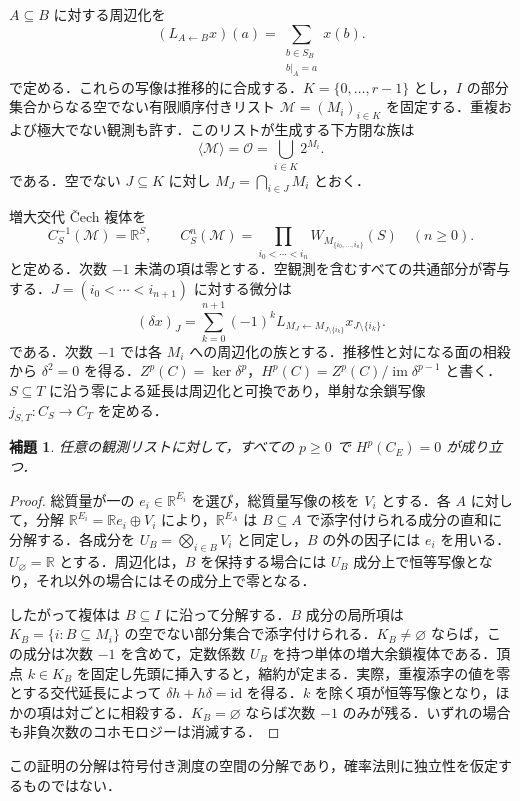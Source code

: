 \documentclass[11pt,a4paper]{article}
\numberwithin{equation}{section}
\theoremstyle{japanese}
\newtheorem{lemma}[theorem]{補題}
\theoremstyle{remark}
\newcommand{\R}{\mathbb R}
\newcommand{\M}{\mathcal M}
\newcommand{\OO}{\mathcal O}
\newcommand{\im}{\operatorname{im}}
\newcommand{\id}{\mathrm{id}}
\begin{document}
$A\subseteq B$ に対する周辺化を
\begin{equation}\label{eq:marginal}
 (L_{A\leftarrow B}x)(a)=\sum_{\substack{b\in S_B\\b|_A=a}}x(b).
\end{equation}
で定める．これらの写像は推移的に合成する．$K=\{0,\ldots,r-1\}$ とし，$I$ の部分集合からなる空でない有限順序付きリスト $\M=(M_i)_{i\in K}$ を固定する．重複および極大でない観測も許す．このリストが生成する下方閉な族は
\[
 \langle\M\rangle=\OO=\bigcup_{i\in K}2^{M_i}.
\]
である．空でない $J\subseteq K$ に対し $M_J=\bigcap_{i\in J}M_i$ とおく．

増大交代 {\latinfont\v{C}ech} 複体を
\begin{equation}\label{eq:complex}
 C_S^{-1}(\M)=\R^S,\qquad
 C_S^n(\M)=\prod_{i_0<\cdots<i_n}W_{M_{\{i_0,\ldots,i_n\}}}(S)\quad(n\ge0).
\end{equation}
と定める．次数 $-1$ 未満の項は零とする．空観測を含むすべての共通部分が寄与する．$J=(i_0<\cdots<i_{n+1})$ に対する微分は
\begin{equation}\label{eq:delta}
 (\delta x)_J=\sum_{k=0}^{n+1}(-1)^k
 L_{M_J\leftarrow M_{J\setminus\{i_k\}}}x_{J\setminus\{i_k\}}.
\end{equation}
である．次数 $-1$ では各 $M_i$ への周辺化の族とする．推移性と対になる面の相殺から $\delta^2=0$ を得る．$Z^p(C)=\ker\delta^p$，$H^p(C)=Z^p(C)/\im\delta^{p-1}$ と書く．$S\subseteq T$ に沿う零による延長は周辺化と可換であり，単射な余鎖写像 $j_{S,T}:C_S\to C_T$ を定める．

\begin{lemma}\label{lem:acyclic}
任意の観測リストに対して，すべての $p\ge0$ で $H^p(C_E)=0$ が成り立つ．
\end{lemma}
\begin{proof}
総質量が一の $e_i\in\R^{E_i}$ を選び，総質量写像の核を $V_i$ とする．各 $A$ に対して，分解 $\R^{E_i}=\R e_i\oplus V_i$ により，$\R^{E_A}$ は $B\subseteq A$ で添字付けられる成分の直和に分解する．各成分を $U_B=\bigotimes_{i\in B}V_i$ と同定し，$B$ の外の因子には $e_i$ を用いる．$U_\varnothing=\R$ とする．周辺化は，$B$ を保持する場合には $U_B$ 成分上で恒等写像となり，それ以外の場合にはその成分上で零となる．

したがって複体は $B\subseteq I$ に沿って分解する．$B$ 成分の局所項は $K_B=\{i:B\subseteq M_i\}$ の空でない部分集合で添字付けられる．$K_B\ne\varnothing$ ならば，この成分は次数 $-1$ を含めて，定数係数 $U_B$ を持つ単体の増大余鎖複体である．頂点 $k\in K_B$ を固定し先頭に挿入すると，縮約が定まる．実際，重複添字の値を零とする交代延長によって $\delta h+h\delta=\id$ を得る．$k$ を除く項が恒等写像となり，ほかの項は対ごとに相殺する．$K_B=\varnothing$ ならば次数 $-1$ のみが残る．いずれの場合も非負次数のコホモロジーは消滅する．
\end{proof}
この証明の分解は符号付き測度の空間の分解であり，確率法則に独立性を仮定するものではない．
\end{document}
